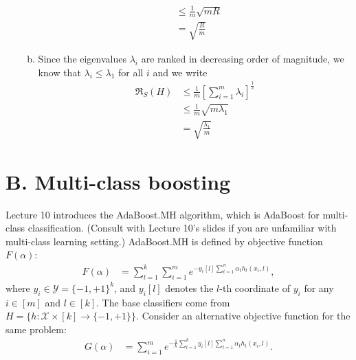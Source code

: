 \documentclass{article}
\newcommand{\cX}{{\mathcal X}}
\newcommand{\cY}{{\mathcal Y}}
\newcommand{\R}{\mathfrak{R}}
\begin{document}
\begin{enumerate}
\begin{enumerate}[(a)]
\begin{align*}
            &\leq \frac{1}{m}\sqrt{mR} \\
            &= \sqrt{\frac{R}{m}}
        \end{align*}
        \item Since the eigenvalues $\lambda_i$ are ranked in decreasing order of magnitude, we know that $\lambda_i \leq \lambda_1$ for all $i$ and we write
        \begin{align*}
            \R_S(H) &\leq \frac{1}{m}\left[\sum_{i=1}^{m}\lambda_i\right]^{\frac{1}{2}} \\
            &\leq \frac{1}{m}\sqrt{m\lambda_1} \\
            &= \sqrt{\frac{\lambda_1}{m}}
        \end{align*}
    \end{enumerate}
\end{enumerate}

\clearpage

\section*{B. Multi-class boosting}
Lecture 10 introduces the AdaBoost.MH algorithm, which is AdaBoost for multi-class classification. (Consult with Lecture 10's slides if you are unfamiliar with  multi-class learning setting.) AdaBoost.MH is defined by objective function $F(\alpha)$:
\begin{align*}
F(\alpha)&=  \sum_{l=1}^k \sum_{i=1}^m e^{- y_i[l]\sum_{t=1}^n \alpha_t h_t(x_i,l)},
\end{align*}
where $y_i \in \cY=\{-1,+1\}^k$, and  $y_i[l]$ denotes the $l$-th coordinate of $y_i$ for any $i\in[m]$ and $l\in[k]$. The base classifiers come from $H=\{h: \cX \times [k] \to \{-1,+1\}\}$.
Consider an alternative objective function for the same problem:
\begin{align*}
G(\alpha)&= \sum_{i=1}^m e^{-\frac{1}{k} \sum_{l=1}^k y_i[l]\sum_{t=1}^n \alpha_t h_t(x_i,l)}.
\end{align*}
\end{document}
